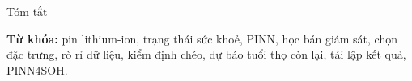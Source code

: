 \begin{preface}{Tóm tắt}
  \TomTat

  \vspace{1em}
  \noindent\textbf{Từ khóa:} pin lithium-ion, trạng thái sức khoẻ, PINN, học bán giám sát, chọn đặc trưng, rò rỉ dữ
  liệu, kiểm định chéo, dự báo tuổi thọ còn lại, tái lập kết quả, PINN4SOH.
\end{preface}
